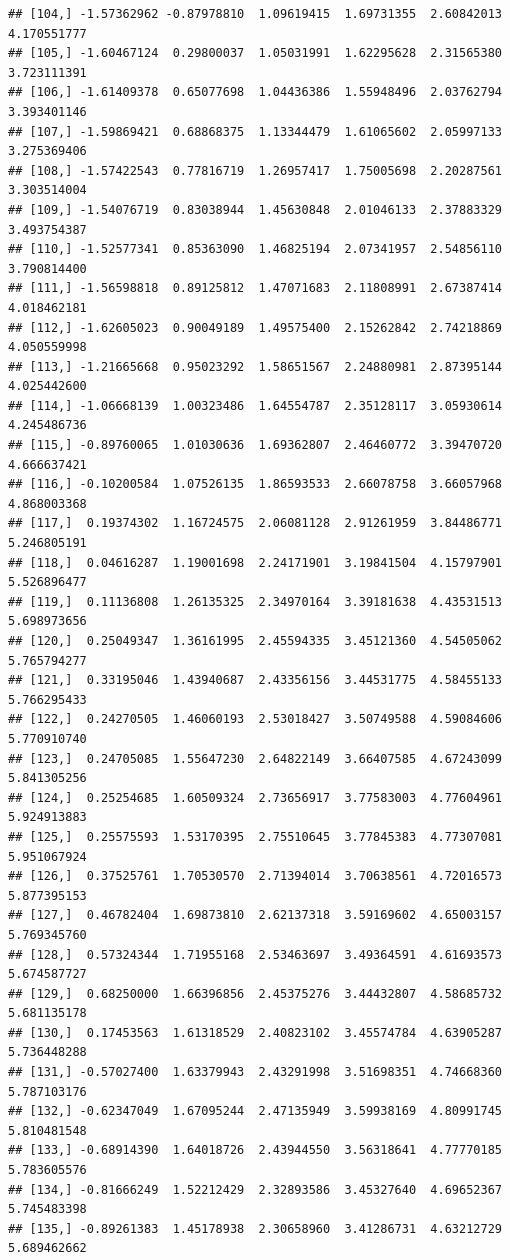 \documentclass{article}\usepackage[]{graphicx}\usepackage[]{color}
\makeatletter
\newenvironment{kframe}{%
 \def\at@end@of@kframe{}%
 \ifinner\ifhmode%
  \def\at@end@of@kframe{\end{minipage}}%
  \begin{minipage}{\columnwidth}%
 \fi\fi%
 \def\FrameCommand##1{\hskip\@totalleftmargin \hskip-\fboxsep
 \colorbox{shadecolor}{##1}\hskip-\fboxsep
     \hskip-\linewidth \hskip-\@totalleftmargin \hskip\columnwidth}%
 \MakeFramed {\advance\hsize-\width
   \@totalleftmargin\z@ \linewidth\hsize
   \@setminipage}}%
 {\par\unskip\endMakeFramed%
 \at@end@of@kframe}
\newenvironment{knitrout}{}{} %
\makeatother
\begin{document}
\begin{knitrout}
\begin{kframe}
\begin{verbatim}
## [104,] -1.57362962 -0.87978810  1.09619415  1.69731355  2.60842013  4.170551777
## [105,] -1.60467124  0.29800037  1.05031991  1.62295628  2.31565380  3.723111391
## [106,] -1.61409378  0.65077698  1.04436386  1.55948496  2.03762794  3.393401146
## [107,] -1.59869421  0.68868375  1.13344479  1.61065602  2.05997133  3.275369406
## [108,] -1.57422543  0.77816719  1.26957417  1.75005698  2.20287561  3.303514004
## [109,] -1.54076719  0.83038944  1.45630848  2.01046133  2.37883329  3.493754387
## [110,] -1.52577341  0.85363090  1.46825194  2.07341957  2.54856110  3.790814400
## [111,] -1.56598818  0.89125812  1.47071683  2.11808991  2.67387414  4.018462181
## [112,] -1.62605023  0.90049189  1.49575400  2.15262842  2.74218869  4.050559998
## [113,] -1.21665668  0.95023292  1.58651567  2.24880981  2.87395144  4.025442600
## [114,] -1.06668139  1.00323486  1.64554787  2.35128117  3.05930614  4.245486736
## [115,] -0.89760065  1.01030636  1.69362807  2.46460772  3.39470720  4.666637421
## [116,] -0.10200584  1.07526135  1.86593533  2.66078758  3.66057968  4.868003368
## [117,]  0.19374302  1.16724575  2.06081128  2.91261959  3.84486771  5.246805191
## [118,]  0.04616287  1.19001698  2.24171901  3.19841504  4.15797901  5.526896477
## [119,]  0.11136808  1.26135325  2.34970164  3.39181638  4.43531513  5.698973656
## [120,]  0.25049347  1.36161995  2.45594335  3.45121360  4.54505062  5.765794277
## [121,]  0.33195046  1.43940687  2.43356156  3.44531775  4.58455133  5.766295433
## [122,]  0.24270505  1.46060193  2.53018427  3.50749588  4.59084606  5.770910740
## [123,]  0.24705085  1.55647230  2.64822149  3.66407585  4.67243099  5.841305256
## [124,]  0.25254685  1.60509324  2.73656917  3.77583003  4.77604961  5.924913883
## [125,]  0.25575593  1.53170395  2.75510645  3.77845383  4.77307081  5.951067924
## [126,]  0.37525761  1.70530570  2.71394014  3.70638561  4.72016573  5.877395153
## [127,]  0.46782404  1.69873810  2.62137318  3.59169602  4.65003157  5.769345760
## [128,]  0.57324344  1.71955168  2.53463697  3.49364591  4.61693573  5.674587727
## [129,]  0.68250000  1.66396856  2.45375276  3.44432807  4.58685732  5.681135178
## [130,]  0.17453563  1.61318529  2.40823102  3.45574784  4.63905287  5.736448288
## [131,] -0.57027400  1.63379943  2.43291998  3.51698351  4.74668360  5.787103176
## [132,] -0.62347049  1.67095244  2.47135949  3.59938169  4.80991745  5.810481548
## [133,] -0.68914390  1.64018726  2.43944550  3.56318641  4.77770185  5.783605576
## [134,] -0.81666249  1.52212429  2.32893586  3.45327640  4.69652367  5.745483398
## [135,] -0.89261383  1.45178938  2.30658960  3.41286731  4.63212729  5.689462662

\end{verbatim}
\end{kframe}
\end{knitrout}
\end{document}
